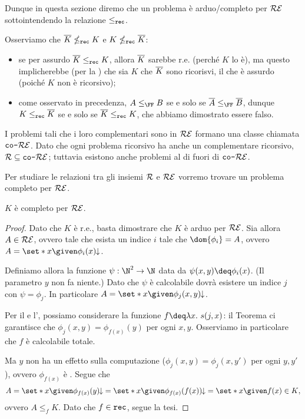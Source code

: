 Dunque in questa sezione diremo che un problema è arduo/completo per $\mathcal{RE}$ sottointendendo la relazione $\leq_{\texttt{rec}}$.   

\begin{remark} 
    Osserviamo che $\overline{K} \nleq_{\texttt{rec}} K$ e $K \nleq_{\texttt{rec}} \overline{K}$: \begin{itemize}
        \item se per assurdo $\overline{K} \leq_{\texttt{rec}} K$, allora $\overline{K}$ sarebbe r.e. (perché $K$ lo è), ma questo implicherebbe (per la ) che sia $K$ che $\overline{K}$ sono ricorisvi, il che è assurdo (poiché $K$ non è ricorsivo);
        \item come osservato in precedenza, $A \leq_{\FF} B$ se e solo se $\compl{A} \leq_{\FF} \compl{B}$, dunque $K \leq_{\texttt{rec}} \overline{K}$ se e solo se $\overline{K} \leq_{\texttt{rec}} K$, che abbiamo dimostrato essere falso.   
    \end{itemize}  
\end{remark}

I problemi tali che i loro complementari sono in $\mathcal{RE}$ formano una classe chiamata $\texttt{co-}\mathcal{RE}$. Dato che ogni problema ricorsivo ha anche un complementare ricorsivo, $\mathcal{R} \subseteq \texttt{co-}\mathcal{RE}$; tuttavia esistono anche problemi al di fuori di $\texttt{co-}\mathcal{RE}$.   

\medskip

Per studiare le relazioni tra gli insiemi $\mathcal{R}$ e $\mathcal{RE}$ vorremo trovare un problema completo per $\mathcal{RE}$.

\begin{theorem}
    $K$ è completo per $\mathcal{RE}$. 
\end{theorem}
\begin{proof}
    Dato che $K$ è r.e., basta dimostrare che $K$ è arduo per $\mathcal{RE}$. Sia allora $A \in \mathcal{RE}$, ovvero tale che esista un indice $i$ tale che $\dom{\phi_i} = A$, ovvero $A = \set*{x \given \phi_i(x)\conv}$.
    
    Definiamo allora la funzione $\psi : \N^2 \to \N$ data da $\psi(x, y) \deq \phi_i(x)$. (Il parametro $y$ non fa niente.)
    Dato che $\psi$ è calcolabile dovrà esistere un indice $j$ con $\psi = \phi_j$. In particolare $A = \set*{x \given \phi_j(x, y)\conv}$.
    
    Per il  e l', possiamo considerare la funzione $f \deq \lam{x}{s(j, x)}$: il Teorema ci garantisce che $\phi_j(x, y) = \phi_{f(x)}(y)$ per ogni $x, y$. Osserviamo in particolare che $f$ è calcolabile totale.

    Ma $y$ non ha un effetto sulla computazione ($\phi_j(x, y) = \phi_j(x, y')$ per ogni $y, y'$), ovvero $\phi_{f(x)}$ è . Segue che \[
        A = \set*{x \given \phi_{f(x)}(y)\conv} = \set*{x \given \phi_{f(x)}(f(x))\conv} = \set*{x \given f(x) \in K},
    \] ovvero $A \leq_f K$. Dato che $f \in \texttt{rec}$, segue la tesi.
\end{proof}

